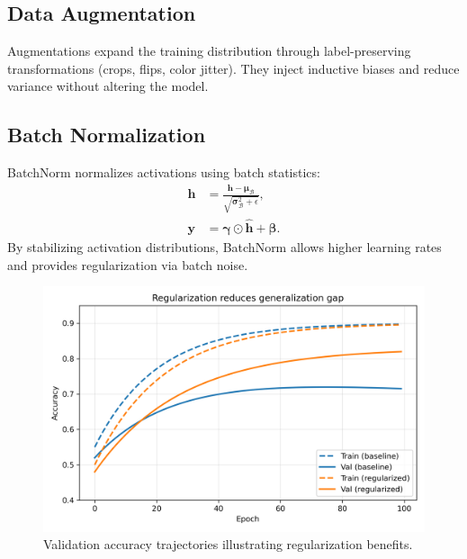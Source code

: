 ﻿\documentclass[12pt]{article}
\begin{document}
\subsection{Data Augmentation}
Augmentations expand the training distribution through label-preserving transformations (crops, flips, color jitter). They inject inductive biases and reduce variance without altering the model.

\subsection{Batch Normalization}
BatchNorm normalizes activations using batch statistics:
\begin{align}
  \hat{\mathbf{h}} &= \frac{\mathbf{h} - \boldsymbol{\mu}_\mathcal{B}}{\sqrt{\boldsymbol{\sigma}_\mathcal{B}^2 + \epsilon}}, \\
  \mathbf{y} &= \boldsymbol{\gamma} \odot \hat{\mathbf{h}} + \boldsymbol{\beta}.
\end{align}
By stabilizing activation distributions, BatchNorm allows higher learning rates and provides regularization via batch noise.

\begin{figure}[H]
  \centering
  \includegraphics[width=0.8\linewidth]{regularization_effects.png}
  \caption{Validation accuracy trajectories illustrating regularization benefits.}
  \label{fig:regularization_effects}
\end{figure}
\FloatBarrier
\end{document}

